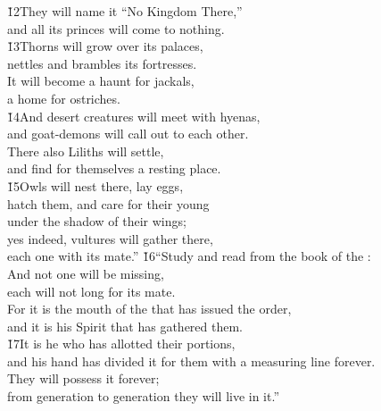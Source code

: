 \begin{poetry}
\poeml \v{12}They will name it ``No Kingdom There,'' \\
\poemll    and all its princes will come to nothing. \\
\poeml \v{13}Thorns will grow over its palaces, \\
\poemll    nettles and brambles its fortresses. \\
\poeml It will become a haunt for jackals, \\
\poemll    a home for ostriches. \\
\poeml \v{14}And desert creatures will meet with hyenas, \\
\poemll    and goat-demons will call out to each other. \\
\poeml There also Liliths will settle, \\
\poemll    and find for themselves a resting place. \\
\poeml \v{15}Owls will nest there, lay eggs, \\
\poemll    hatch them, and care for their young \\
\poemlll       under the shadow of their wings; \\
\poeml yes indeed, vultures will gather there, \\
\poemll    each one with its mate.''
\poeml \v{16}``Study and read from the book of the : \\
\poemll    And not one will be missing, \\
\poemlll       each will not long for its mate. \\
\poeml For it is the mouth of the  that has issued the order, \\
\poemll    and it is his Spirit that has gathered them. \\
\poeml \v{17}It is he who has allotted their portions, \\
\poemll    and his hand has divided it for them with a measuring line forever. \\
\poeml They will possess it forever; \\
\poemll    from generation to generation they will live in it.''
\end{poetry}

